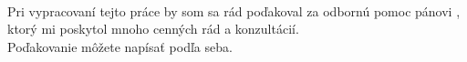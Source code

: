 \mbox{}
\vfill
\begin{flushleft}
    \textbf{\lnacknowledgement}\\[3.2em]
Pri vypracovaní tejto práce by som sa rád poďakoval za odbornú pomoc pánovi \supervisor, ktorý mi poskytol mnoho cenných rád a konzultácií.
\vspace{1em}\\
\small{Poďakovanie môžete napísať podľa seba.}
\end{flushleft}

